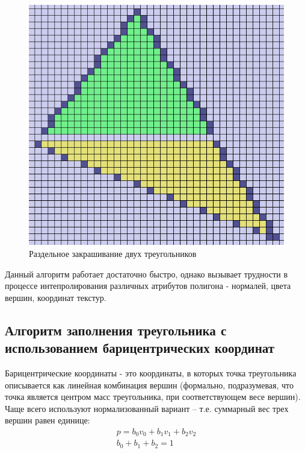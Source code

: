 \documentclass[12pt,a4paper,oneside]{report}
\begin{document}
	\begin{figure}[H]
		\centering
		\includegraphics[scale=0.4]{11_triangle_yrast}
		\caption{Раздельное закрашивание двух треугольников}
	\end{figure}

	 Данный алгоритм работает достаточно быстро, однако вызывает трудности в процессе интепролирования различных атрибутов полигона - нормалей, цвета вершин, координат текстур.
	
	\subsection{Алгоритм заполнения треугольника с использованием барицентрических координат}
	  \quad Барицентрические координаты - это координаты, в которых точка треугольника описывается как линейная комбинация вершин (формально, подразумевая, что точка является центром масс треугольника, при соответствующем весе вершин). Чаще всего используют нормализованный вариант -- т.е. суммарный вес трех вершин равен единице:
	\begin{equation}
	\begin{gathered}
	p = b_0  v_0 + b_1   v_1 + b_2  v_2\\
	b_0 + b_1 + b_2 = 1
	\end{gathered}
	\end{equation}
	
\end{document}
